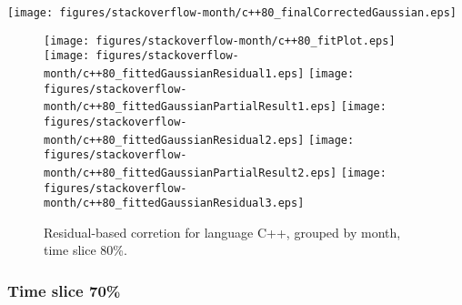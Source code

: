 \begin{center}
{\texttt{[image: figures/stackoverflow-month/c++80\_finalCorrectedGaussian.eps]}}
\end{center}

\FloatBarrier

\begin{figure}[t]
\centering
{}
{\texttt{[image: figures/stackoverflow-month/c++80\_fitPlot.eps]}}
{\texttt{[image: figures/stackoverflow-month/c++80\_fittedGaussianResidual1.eps]}}
{\texttt{[image: figures/stackoverflow-month/c++80\_fittedGaussianPartialResult1.eps]}}
{\texttt{[image: figures/stackoverflow-month/c++80\_fittedGaussianResidual2.eps]}}
{\texttt{[image: figures/stackoverflow-month/c++80\_fittedGaussianPartialResult2.eps]}}
{\texttt{[image: figures/stackoverflow-month/c++80\_fittedGaussianResidual3.eps]}}
\caption{Residual-based corretion for language C++, grouped by month, time slice 80\%.}
\end{figure}


\FloatBarrier


\subsubsection{Time slice 70\%}

